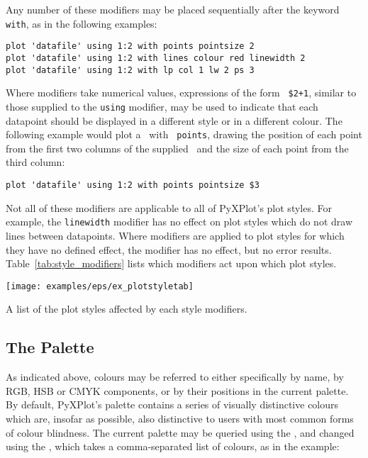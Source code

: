 Any number of these modifiers may be placed sequentially after the keyword {\tt
with}, as in the following examples:

\begin{verbatim}
plot 'datafile' using 1:2 with points pointsize 2
plot 'datafile' using 1:2 with lines colour red linewidth 2
plot 'datafile' using 1:2 with lp col 1 lw 2 ps 3
\end{verbatim}

\noindent Where modifiers take numerical values, expressions of the form {\tt
\$2+1}, similar to those supplied to the {\tt using} modifier, may be used to
indicate that each datapoint should be displayed in a different style or in a
different colour. The following example would plot a \datafile\ with {\tt
points}, drawing the position of each point from the first two columns of the
supplied \datafile\ and the size of each point from the third column:
\begin{verbatim}
plot 'datafile' using 1:2 with points pointsize $3
\end{verbatim}

Not all of these modifiers are applicable to all of PyXPlot's plot styles. For
example, the {\tt line\-width} modifier has no effect on plot styles which do
not draw lines between datapoints. Where modifiers are applied to plot styles
for which they have no defined effect, the modifier has no effect, but no error
results.  Table~\ref{tab:style_modifiers} lists which modifiers act upon which
plot styles.

\begin{table}
\centerline{\texttt{[image: examples/eps/ex\_plotstyletab]}}
\caption{A list of the plot styles affected by each style modifiers.}
\label{tab:style_modifiers}
\end{table}

\subsection{The Palette}
\label{sec:palette}

 As indicated above, colours
may be referred to either specifically by name, by RGB, HSB or CMYK components,
or by their positions in the current palette. By default, PyXPlot's palette
contains a series of visually distinctive colours which are, insofar as
possible, also distinctive to users with most common forms of colour blindness.
The current palette may be queried using the , and
changed using the , which takes a comma-separated list of
colours, as in the example:

